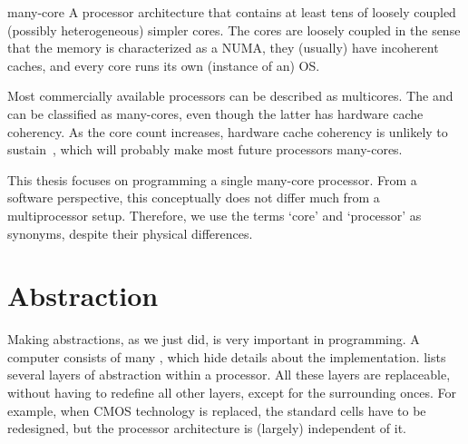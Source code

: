 \begin{describe}{many-core}
	A processor architecture that contains at least tens of loosely coupled (possibly heterogeneous) simpler cores.
	The cores are loosely coupled in the sense that the memory is characterized as a \ac{NUMA}, they (usually) have incoherent caches, and every core runs its own (instance of an) \ac{OS}.
\end{describe}

Most commercially available processors can be described as multicores.
The \IntelSCC and \XeonPhi can be classified as many-cores, even though the latter has hardware cache coherency.
As the core count increases, hardware cache coherency is unlikely to sustain~\cite{choi:denovo}, which will probably make most future processors many-cores.

This thesis focuses on programming a single many-core processor.
From a software perspective, this conceptually does not differ much from a multiprocessor setup.
Therefore, we use the terms `core' and `processor' as synonyms, despite their physical differences.


\section{Abstraction}


Making abstractions, as we just did, is very important in programming.
A computer consists of many , which hide details about the implementation.
 lists several layers of abstraction within a processor.
All these layers are replaceable, without having to redefine all other layers, except for the surrounding onces.
For example, when \ac{CMOS} technology is replaced, the standard cells have to be redesigned, but the processor architecture is (largely) independent of it.


